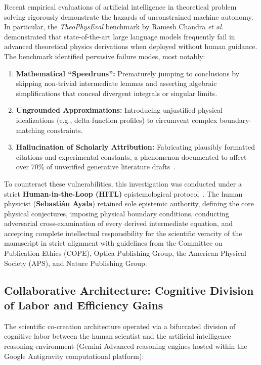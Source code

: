 \documentclass{optica-article}
\begin{document}
Recent empirical evaluations of artificial intelligence in theoretical problem solving rigorously demonstrate the hazards of unconstrained machine autonomy. In particular, the \emph{TheoPhysEval} benchmark by Ramesh Chandra \emph{et al.}~\cite{Chandra2026TheoPhysEval} demonstrated that state-of-the-art large language models frequently fail in advanced theoretical physics derivations when deployed without human guidance. The benchmark identified pervasive failure modes, most notably:
\begin{enumerate}
    \item \textbf{Mathematical ``Speedruns'':} Prematurely jumping to conclusions by skipping non-trivial intermediate lemmas and asserting algebraic simplifications that conceal divergent integrals or singular limits.
    \item \textbf{Ungrounded Approximations:} Introducing unjustified physical idealizations (e.g., delta-function profiles) to circumvent complex boundary-matching constraints.
    \item \textbf{Hallucination of Scholarly Attribution:} Fabricating plausibly formatted citations and experimental constants, a phenomenon documented to affect over 70\% of unverified generative literature drafts~\cite{Kacena2024}.
\end{enumerate}

To counteract these vulnerabilities, this investigation was conducted under a strict \textbf{Human-in-the-Loop (HITL)} epistemological protocol~\cite{Haber2025,Jauhiainen2026}. The human physicist (\textbf{Sebastián Ayala}) retained sole epistemic authority, defining the core physical conjectures, imposing physical boundary conditions, conducting adversarial cross-examination of every derived intermediate equation, and accepting complete intellectual responsibility for the scientific veracity of the manuscript in strict alignment with guidelines from the Committee on Publication Ethics (COPE), Optica Publishing Group, the American Physical Society (APS), and Nature Publishing Group.

\subsection{Collaborative Architecture: Cognitive Division of Labor and Efficiency Gains}
\label{subsec:architecture}

The scientific co-creation architecture operated via a bifurcated division of cognitive labor between the human scientist and the artificial intelligence reasoning environment (Gemini Advanced reasoning engines hosted within the Google Antigravity computational platform):
\end{document}
